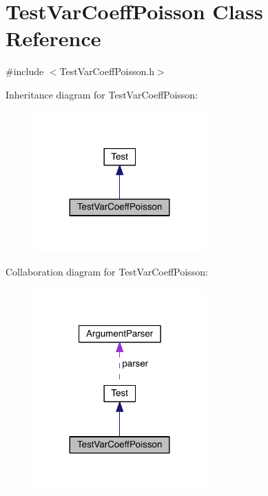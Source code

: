 \hypertarget{class_test_var_coeff_poisson}{}\section{Test\+Var\+Coeff\+Poisson Class Reference}
\label{class_test_var_coeff_poisson}


{\ttfamily \#include $<$Test\+Var\+Coeff\+Poisson.\+h$>$}



Inheritance diagram for Test\+Var\+Coeff\+Poisson\+:\nopagebreak
\begin{figure}[H]
\begin{center}
\leavevmode
\includegraphics[width=188pt]{d0/de5/class_test_var_coeff_poisson__inherit__graph}
\end{center}
\end{figure}


Collaboration diagram for Test\+Var\+Coeff\+Poisson\+:\nopagebreak
\begin{figure}[H]
\begin{center}
\leavevmode
\includegraphics[width=188pt]{d4/d3b/class_test_var_coeff_poisson__coll__graph}
\end{center}
\end{figure}
